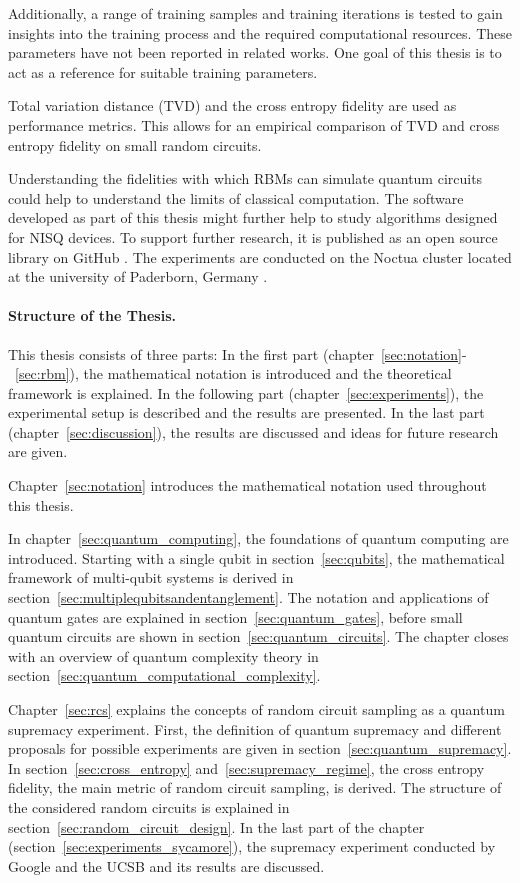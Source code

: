 Additionally, a range of training samples and training iterations 
is tested to gain insights into the training process and the required computational resources. 
These parameters have not been reported in related works. One goal of this thesis is 
to act as a reference for suitable training parameters. 

Total variation distance (TVD) and the cross entropy fidelity are used as 
performance metrics. This allows for an empirical comparison of TVD and cross entropy fidelity 
on small random circuits.

Understanding the
fidelities with which RBMs can simulate quantum circuits could help to understand
the limits of classical computation. The software developed as part of this thesis 
might further help to study algorithms designed for NISQ devices. To support 
further research, it is published as 
an open source library on GitHub \cite{NQS2020}.
The experiments are conducted on the Noctua cluster located at the 
university of Paderborn, Germany \cite{noctua2020}.

\paragraph{Structure of the Thesis.}
This thesis consists of three parts: 
In the first part (chapter~\ref{sec:notation}-~\ref{sec:rbm}), the mathematical 
notation is introduced and the theoretical framework is explained. In the 
following part (chapter~\ref{sec:experiments}), 
the experimental setup is described and the results are presented. 
In the last part (chapter~\ref{sec:discussion}), the results are discussed and 
ideas for future research are given.

Chapter~\ref{sec:notation} introduces the mathematical notation used throughout this 
thesis.

In chapter~\ref{sec:quantum_computing}, the foundations of quantum computing are introduced. 
Starting with a single qubit in section~\ref{sec:qubits}, the mathematical framework of multi-qubit systems is derived
in section~\ref{sec:multiplequbitsandentanglement}. The notation and applications 
of quantum gates are explained in section~\ref{sec:quantum_gates}, before small quantum circuits are shown
in section~\ref{sec:quantum_circuits}. The chapter closes with an overview of quantum complexity 
theory in section~\ref{sec:quantum_computational_complexity}.

Chapter~\ref{sec:rcs} explains the concepts of random circuit sampling as a quantum supremacy experiment.
First, the definition of quantum supremacy and different proposals for possible experiments 
are given in section~\ref{sec:quantum_supremacy}. 
In section~\ref{sec:cross_entropy} and~\ref{sec:supremacy_regime}, the 
cross entropy fidelity, the main metric of random circuit sampling, is derived.
The structure of the considered random circuits is explained in section~\ref{sec:random_circuit_design}.
In the last part of the chapter (section~\ref{sec:experiments_sycamore}), the supremacy experiment conducted by Google and the UCSB 
and its results are discussed.

